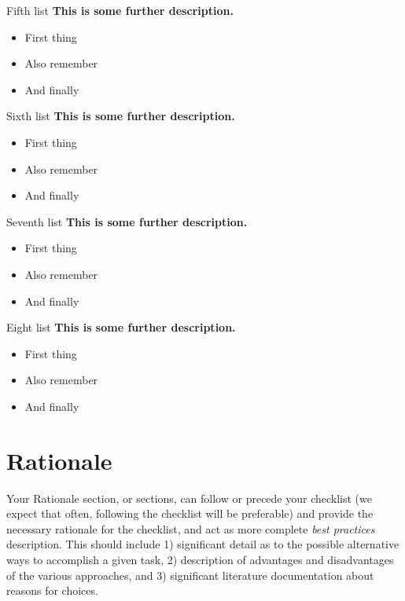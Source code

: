 \documentclass[9pt,bestpractices]{livecoms}
\begin{document}
\begin{Checklists*}[p!]
\begin{checklist}{Fifth list}
\textbf{This is some further description.}
\begin{itemize}
\item First thing
\item Also remember
\item And finally
\end{itemize}
\end{checklist}
\pagebreak
\begin{checklist}{Sixth list}
\textbf{This is some further description.}
\begin{itemize}
\item First thing
\item Also remember
\item And finally
\end{itemize}
\end{checklist}

\begin{checklist}{Seventh list}
\textbf{This is some further description.}
\begin{itemize}
\item First thing
\item Also remember
\item And finally
\end{itemize}
\end{checklist}

\begin{checklist}{Eight list}
\textbf{This is some further description.}
\begin{itemize}
\item First thing
\item Also remember
\item And finally
\end{itemize}
\end{checklist}

\end{Checklists*}





\section{Rationale}

Your Rationale section, or sections, can follow or precede your checklist (we expect that often, following the checklist will be preferable) and provide the necessary rationale for the checklist, and act as more complete \emph{best practices} description.
This should include 1) significant detail as to the possible alternative ways to accomplish a given task, 2) description of advantages and disadvantages of the various approaches, and 3) significant literature documentation about reasons for choices.
\end{document}
